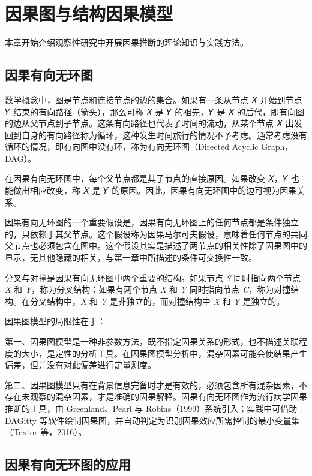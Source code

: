 \documentclass[
  chinese-hans,
  letterpaper,
  DIV=11,
  numbers=noendperiod]{scrreprt}
\begin{document}
\chapter{因果图与结构因果模型}\label{ux56e0ux679cux56feux4e0eux7ed3ux6784ux56e0ux679cux6a21ux578b}

本章开始介绍观察性研究中开展因果推断的理论知识与实践方法。

\section{因果有向无环图}\label{ux56e0ux679cux6709ux5411ux65e0ux73afux56fe}

数学概念中，图是节点和连接节点的边的集合。如果有一条从节点 𝑋 开始到节点
𝑌 结束的有向路径（箭头），那么可称 𝑋 是 𝑌 的祖先，𝑌 是 𝑋
的后代，即有向图的边从父节点到子节点。这条有向路径也代表了时间的流动，从某个节点
𝑋
出发回到自身的有向路径称为循环，这种发生时间旅行的情况不予考虑。通常考虑没有循环的情况，即有向图中没有环，称为有向无环图（Directed
Acyclic Graph，DAG）。

在因果有向无环图中，每个父节点都是其子节点的直接原因。如果改变 𝑋，𝑌
也能做出相应改变，称 𝑋 是 𝑌
的原因。因此，因果有向无环图中的边可视为因果关系。

因果有向无环图的一个重要假设是，因果有向无环图上的任何节点都是条件独立的，只依赖于其父节点。这个假设称为因果马尔可夫假设，意味着任何节点的共同父节点也必须包含在图中。这个假设其实是描述了两节点的相关性除了因果图中的显示，无其他隐藏的相关，与第一章中所描述的条件可交换性一致。

分叉与对撞是因果有向无环图中两个重要的结构。如果节点 \emph{S}
同时指向两个节点 \emph{X} 和 \emph{Y}，称为分叉结构；如果有两个节点
\emph{X} 和 \emph{Y} 同时指向节点
\emph{C}，称为对撞结构。在分叉结构中，\emph{X} 和 \emph{Y}
是非独立的，而对撞结构中 \emph{X} 和 \emph{Y} 是独立的。

因果图模型的局限性在于：

第一、因果图模型是一种非参数方法，既不指定因果关系的形式，也不描述关联程度的大小，是定性的分析工具。在因果图模型分析中，混杂因素可能会使结果产生偏差，但并没有对此偏差进行定量测度。

第二、因果图模型只有在背景信息完备时才是有效的，必须包含所有混杂因素，不存在未观察的混杂因素，才是准确的因果解释。因果有向无环图作为流行病学因果推断的工具，由
Greenland、Pearl 与 Robins（1999）系统引入；实践中可借助 DAGitty
等软件绘制因果图，并自动判定为识别因果效应所需控制的最小变量集（Textor
等，2016）。

\section{因果有向无环图的应用}\label{ux56e0ux679cux6709ux5411ux65e0ux73afux56feux7684ux5e94ux7528}
\end{document}
